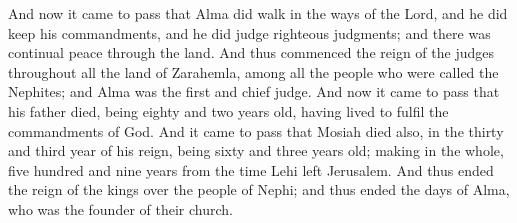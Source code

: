 \bverse \iffalse And now it came to pass that Alma did walk in the ways of the Lord, and he did keep his commandments, and he did judge righteous judgments; and there was continual peace through the land. \fi
And now it came to pass that Alma did walk in the ways of the Lord, and he did keep his commandments, and he did judge righteous judgments; and there was continual peace through the land.
\bverse \iffalse And thus commenced the reign of the judges throughout all the land of Zarahemla, among all the people who were called the Nephites; and Alma was the first and chief judge. \fi
And thus commenced the reign of the judges throughout all the land of Zarahemla, among all the people who were called the Nephites; and Alma was the first and chief judge.
\bverse \iffalse And now it came to pass that his father died, being eighty and two years old, having lived to fulfil the commandments of God. \fi
And now it came to pass that his father died, being eighty and two years old, having lived to fulfil the commandments of God.
\bverse \iffalse And it came to pass that Mosiah died also, in the thirty and third year of his reign, being sixty and three years old; making in the whole, five hundred and nine years from the time Lehi left Jerusalem. \fi
And it came to pass that Mosiah died also, in the thirty and third year of his reign, being sixty and three years old; making in the whole, five hundred and nine years from the time Lehi left Jerusalem.
\bverse \iffalse And thus ended the reign of the kings over the people of Nephi; and thus ended the days of Alma, who was the founder of their church. \fi
And thus ended the reign of the kings over the people of Nephi; and thus ended the days of Alma, who was the founder of their church.

